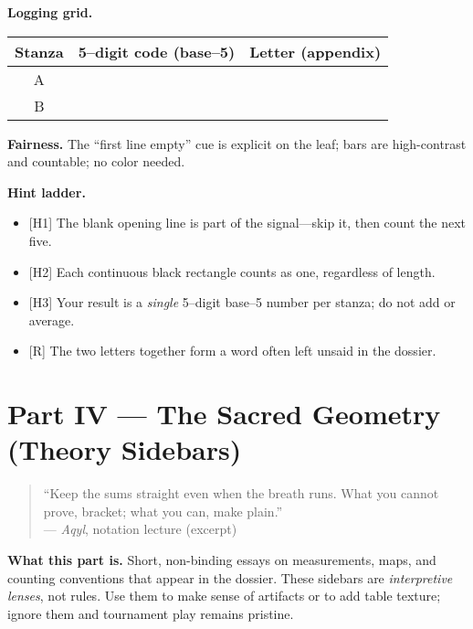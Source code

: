 \documentclass[11pt]{article}
\begin{document}
\begin{itemize}
\medskip
\noindent\textbf{Logging grid.}
\begin{center}
\begin{tabular}{c|c|c}
\textbf{Stanza} & \textbf{5–digit code (base–5)} & \textbf{Letter (appendix)} \\
\hline
A & \hspace{3.5cm} & \hspace{1.2cm} \\
B & \hspace{3.5cm} & \hspace{1.2cm} \\
\end{tabular}
\end{center}

\medskip
\noindent\textbf{Fairness.} The “first line empty” cue is explicit on the leaf; bars are high-contrast and countable; no color needed.

\medskip
\noindent\textbf{Hint ladder.}
\begin{itemize}\setlength\itemsep{0.25em}
  \item \textsc{[H1]} The blank opening line is part of the signal—skip it, then count the next five.
  \item \textsc{[H2]} Each continuous black rectangle counts as one, regardless of length.
  \item \textsc{[H3]} Your result is a \emph{single} 5–digit base–5 number per stanza; do not add or average.
  \item \textsc{[R]} The two letters together form a word often left unsaid in the dossier.
\end{itemize}

\clearpage
\section{Part IV — The Sacred Geometry (Theory Sidebars)}
\label{part:konmetry}
{}

\begin{quote}\small
“Keep the sums straight even when the breath runs. What you cannot prove, bracket; what you can, make plain.”\\
\hfill — \textit{Aqyl}, notation lecture (excerpt)
\end{quote}

\noindent\textbf{What this part is.} Short, non-binding essays on measurements, maps, and counting conventions that appear in the dossier. These sidebars are \emph{interpretive lenses}, not rules. Use them to make sense of artifacts or to add table texture; ignore them and tournament play remains pristine.


\end{itemize}
\end{document}
